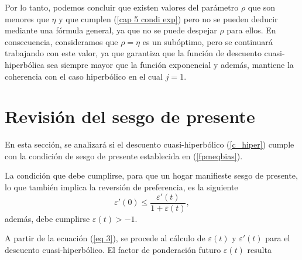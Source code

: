 
Por lo tanto, podemos concluir que existen valores del parámetro $\rho$ que son menores que $\eta$ y que cumplen (\ref{cap 5 condi exp}) pero no se pueden deducir mediante una fórmula general, ya que no se puede despejar $\rho$ para ellos. En consecuencia, consideramos que $\rho=\eta$ es un subóptimo, pero se continuará trabajando con este valor, ya que garantiza que la función de descuento cuasi-hiperbólica sea siempre mayor que la función exponencial y además, mantiene la coherencia con el caso hiperbólico en el cual $j=1$.

\section{Revisión del sesgo de presente}
\label{section_sesgo_presente}
En esta sección, se analizará si el descuento cuasi-hiperbólico (\ref{c_hiper}) cumple con la condición de sesgo de presente establecida en (\ref{fpmeqbias}).

La condición que debe cumplirse, para que un hogar manifieste sesgo de presente, lo que también implica la reversión de preferencia, es la siguiente
\begin{equation*}
\varepsilon'(0) \leq  \dfrac{\varepsilon'(t)}{1+ \varepsilon(t)},
\end{equation*}
además, debe cumplirse $\varepsilon(t) > -1$.

A partir de la ecuación (\ref{eq 3}), se procede al cálculo de $\varepsilon(t)$ y $\varepsilon'(t)$  para el descuento cuasi-hiperbólico. %
 El factor de ponderación futuro $\varepsilon(t)$ resulta
 

